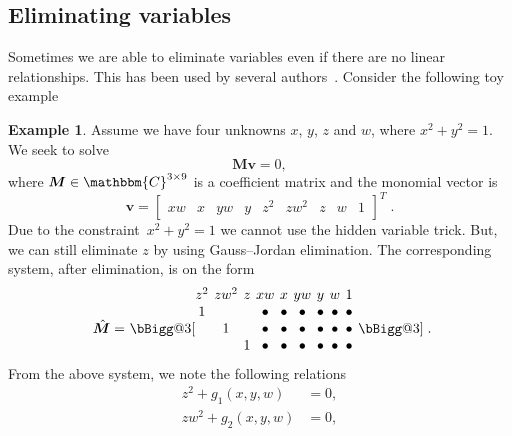 \documentclass[11pt,a4paper]{article}
\makeatletter
\theoremstyle{definition}
\newtheorem{example}{Example}
\newcommand{\HUGE}{\bBigg@{3}}
\newcommand{\T}{T}
\newcommand{\mat}[1]{\bm{#1}}
\newcommand{\C}{\ensuremath{\mathbbm{C}}}
\makeatother
\begin{document}
\subsection{Eliminating variables}
Sometimes we are able to eliminate variables even if there are no linear relationships. This
has been used by several authors~\cite{kukelova-etal-cviu-2010,fraundorfer-etal-eccv-2010,jiang-etal-accv-2014,kukelova-etal-cvpr-2015,valtonenoernhag-springer-2021}.
Consider the following toy example
\begin{example}
Assume we have four unknowns $x$, $y$, $z$ and $w$, where $x^2+y^2=1$. We seek to solve
\begin{equation}
\mat{M}\mat{v} = 0,
\end{equation}
where $\mat{M}\in\C^{3\times 9}$ is a coefficient matrix and the monomial vector is
\setcounter{MaxMatrixCols}{20}
\begin{equation}
    \mat{v} = \begin{bmatrix}
            xw & x &
            yw & y &
            z^2 & zw^2 & z &
            w & 1
        \end{bmatrix}^\T\;.
\end{equation}
Due to the constraint~$x^2+y^2=1$ we cannot use the hidden variable trick. But, we can still
eliminate $z$ by using Gauss--Jordan elimination. The corresponding system, after elimination, is
on the form
\begin{equation}
\raisebox{-6pt}{ $\hat{\mat{M}} =$ }
\raisebox{-6pt}{\HUGE[}
\begingroup %
\setlength\arraycolsep{2pt}
\begin{matrix}
z^2 & zw^2 & z & xw & x & yw & y & w & 1\\
    1 & & & \bullet & \bullet & \bullet & \bullet & \bullet & \bullet & \\
    & 1 & & \bullet & \bullet & \bullet & \bullet & \bullet & \bullet & \\
    & & 1 & \bullet & \bullet & \bullet & \bullet & \bullet & \bullet &
\end{matrix}
\endgroup
\raisebox{-6pt}{\HUGE]\;.}
\end{equation}
From the above system, we note the following relations
\begin{equation}\label{paper04:eq:elim}
    \begin{aligned}
    z^2 + g_1(x,y,w)  &=  0,\\
    zw^2 + g_2(x,y,w)  &=  0,\\

\end{aligned}
\end{equation}
\end{example}
\end{document}
